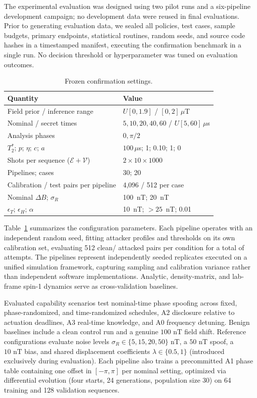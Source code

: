 \documentclass[conference]{IEEEtran}
\newcommand{\Ttwo}{T_2^{\ast}}
\begin{document}
The experimental evaluation was designed using two pilot runs and a six-pipeline development campaign; no development data were reused in final evaluations. Prior to generating evaluation data, we sealed all policies, test cases, sample budgets, primary endpoints, statistical routines, random seeds, and source code hashes in a timestamped manifest, executing the confirmation benchmark in a single run. No decision threshold or hyperparameter was tuned on evaluation outcomes.

\begin{table}[t]
\centering
\caption{Frozen confirmation settings.}
\label{tab:setup}
\footnotesize
\begin{tabular}{@{}p{}p{}@{}}
\toprule
Quantity & Value \\
\midrule
Field prior / inference range & $U[0,1.9]$ / $[0,2]\,\mu$T \\
Nominal / secret times & $5,10,20,40,60$ / $U[5,60]\,\mu$s \\
Analysis phases & $0,\pi/2$ \\
$\Ttwo$; $p$; $\eta$; $c$; $a$ & $100\,\mu$s; 1; 0.10; 1; 0 \\
Shots per sequence ($\mathcal E+\mathcal V$) & $2\times10\times1000$ \\
Pipelines; cases & 30; 20 \\
Calibration / test pairs per pipeline & 4,096 / 512 per case \\
Nominal $\Delta B$; $\sigma_R$ & 100~nT; 20~nT \\
$\epsilon_T$; $\epsilon_H$; $\alpha$ & 10~nT; $>25$~nT; 0.01 \\
\bottomrule
\end{tabular}
\end{table}

Table~\ref{tab:setup} summarizes the configuration parameters. Each pipeline operates with an independent random seed, fitting attacker profiles and thresholds on its own calibration set, evaluating 512 clean/ attacked pairs per condition for a total of \TotalN{} attempts. The pipelines represent independently seeded replicates executed on a unified simulation framework, capturing sampling and calibration variance rather than independent software implementations. Analytic, density-matrix, and lab-frame spin-1 dynamics serve as cross-validation baselines.

Evaluated capability scenarios test nominal-time phase spoofing across fixed, phase-randomized, and time-randomized schedules, A2 disclosure relative to actuation deadlines, A3 real-time knowledge, and A0 frequency detuning. Benign baselines include a clean control run and a genuine $100\text{~nT}$ field shift. Reference configurations evaluate noise levels $\sigma_R \in \{5, 15, 20, 50\}\text{~nT}$, a $50\text{~nT}$ spoof, a $10\text{~nT}$ bias, and shared displacement coefficients $\lambda \in \{0.5, 1\}$ (introduced exclusively during evaluation). Each pipeline also trains a precommitted A1 phase table containing one offset in $[-\pi, \pi]$ per nominal setting, optimized via differential evolution (four starts, 24 generations, population size 30) on 64 training and 128 validation sequences.
\end{document}
